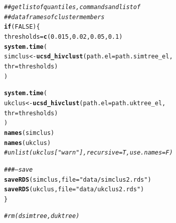 \documentclass[]{revtex4}\usepackage[]{graphicx}\usepackage[]{color}
\makeatletter
\newcommand{\hlnum}[1]{\textcolor[rgb]{0.686,0.059,0.569}{#1}}%
\newcommand{\hlstr}[1]{\textcolor[rgb]{0.192,0.494,0.8}{#1}}%
\newcommand{\hlcom}[1]{\textcolor[rgb]{0.678,0.584,0.686}{\textit{#1}}}%
\newcommand{\hlstd}[1]{\textcolor[rgb]{0.345,0.345,0.345}{#1}}%
\newcommand{\hlkwa}[1]{\textcolor[rgb]{0.161,0.373,0.58}{\textbf{#1}}}%
\newcommand{\hlkwb}[1]{\textcolor[rgb]{0.69,0.353,0.396}{#1}}%
\newcommand{\hlkwc}[1]{\textcolor[rgb]{0.333,0.667,0.333}{#1}}%
\newcommand{\hlkwd}[1]{\textcolor[rgb]{0.737,0.353,0.396}{\textbf{#1}}}%
\newenvironment{kframe}{%
 \def\at@end@of@kframe{}%
 \ifinner\ifhmode%
  \def\at@end@of@kframe{\end{minipage}}%
  \begin{minipage}{\columnwidth}%
 \fi\fi%
 \def\FrameCommand##1{\hskip\@totalleftmargin \hskip-\fboxsep
 \colorbox{shadecolor}{##1}\hskip-\fboxsep
     \hskip-\linewidth \hskip-\@totalleftmargin \hskip\columnwidth}%
 \MakeFramed {\advance\hsize-\width
   \@totalleftmargin\z@ \linewidth\hsize
   \@setminipage}}%
 {\par\unskip\endMakeFramed%
 \at@end@of@kframe}
\newenvironment{knitrout}{}{} %
\makeatother
\begin{document}
\begin{knitrout}
\color{fgcolor}\begin{kframe}
\begin{alltt}
\hlcom{## get list of quantiles, commands and list of}
\hlcom{## dataframes of cluster members }
\hlkwa{if}\hlstd{(}\hlnum{FALSE}\hlstd{)\{}
  \hlstd{thresholds} \hlkwb{=} \hlkwd{c}\hlstd{(}\hlnum{0.015}\hlstd{,} \hlnum{0.02}\hlstd{,} \hlnum{0.05}\hlstd{,} \hlnum{0.1}\hlstd{)}
  \hlkwd{system.time}\hlstd{(}
    \hlstd{simclus} \hlkwb{<-} \hlkwd{ucsd_hivclust}\hlstd{(}\hlkwc{path.el} \hlstd{= path.simtree_el,}
                             \hlkwc{thr} \hlstd{= thresholds)}
  \hlstd{)}

  \hlkwd{system.time}\hlstd{(}
    \hlstd{ukclus} \hlkwb{<-} \hlkwd{ucsd_hivclust}\hlstd{(}\hlkwc{path.el} \hlstd{= path.uktree_el,}
                            \hlkwc{thr} \hlstd{= thresholds)}
  \hlstd{)}
  \hlkwd{names}\hlstd{(simclus)}
  \hlkwd{names}\hlstd{(ukclus)}
  \hlcom{# unlist(ukclus["warn"] , recursive = T, use.names = F)}

  \hlcom{###--- save }
  \hlkwd{saveRDS}\hlstd{(simclus,} \hlkwc{file} \hlstd{=} \hlstr{"data/simclus2.rds"}\hlstd{)}
  \hlkwd{saveRDS}\hlstd{(ukclus,} \hlkwc{file} \hlstd{=} \hlstr{"data/ukclus2.rds"}\hlstd{)}
 \hlstd{\}}

\hlcom{# rm(dsimtree, duktree)}
\end{alltt}
\end{kframe}
\end{knitrout}
\end{document}
